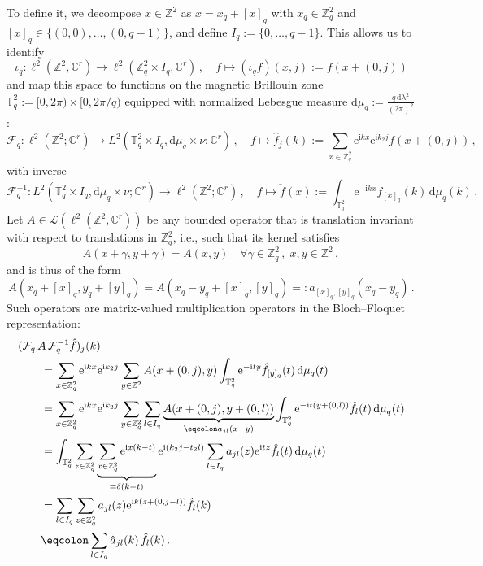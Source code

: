 \documentclass[a4paper]{article}
\newcommand{\T}{\mathbb{T}}
\newcommand{\e}{\mathrm{e}}
\renewcommand{\i}{\mathrm{i}}
\newcommand{\fd}{r}
\newcommand{\Z}{\mathbb{Z}}
\newcommand{\C}{\mathbb{C}}
\newcommand{\mL}{\mathcal{L}}
\theoremstyle{plain}
\theoremstyle{definition}
\theoremstyle{remark}
\renewcommand{\(}{\left(}
\renewcommand{\)}{\right)}
\begin{document}
To define it,  we decompose $x\in\Z^2$ as $x=x_q + [x]_q$ with $x_q\in\Z^2_q$ and $[x]_{q}\in \{(0,0),\ldots,(0,q-1)\}$, and define $I_q:= \{0,\ldots,q-1\}$.
This allows us to  identify 
\[
\iota_q: \ell^2(\Z^2,\C^\fd)\to \ell^2(\Z^2_q \times I_q, \C^{\fd})\,,\quad f\mapsto (\iota_q f)(x,j) := f(x+(0,j))
\]
and map this space to functions on the magnetic Brillouin zone $\T^2_q:= [0,2\pi)\times [0,2\pi/q)$ equipped with normalized Lebesgue measure $\mathrm{d}\mu_q := \frac{q\,\mathrm{d}\lambda^2}{(2\pi)^2}$ :
\[
\mathcal{F}_q: \ell^2(\Z^2;\C^{\fd}) \to L^2(\T^2_q \times I_q,\mathrm{d}\mu_q \times \nu;\C^{\fd})\,,\quad f\mapsto \hat f_j(k) := \sum_{x\in\Z^2_q}\e^{\i k x} \e^{\i k_2 j} f(x+(0,j))\,,
\]
with inverse
\[
\mathcal{F}^{-1}_q:     L^2(\T^2_q \times I_q,\mathrm{d}\mu_q \times \nu;\C^{\fd})\to \ell^2(\Z^2 ;\C^{\fd})\,,\quad f \mapsto \check f(x) := \int_{\T^2_q} \e^{-\i k x} f_{[x]_q}(k)\, \mathrm{d}\mu_q(k)\,.
\]
Let $A\in\mL(\ell^2(\Z^2,\C^\fd))$ be any bounded operator that is translation invariant with respect to translations in $\Z^2_q$, i.e., such that its kernel satisfies 
\[
A(x+\gamma,y+\gamma) = A(x,y) \quad \forall \gamma\in\Z^2_q\,,\;x,y\in \Z^2\,,
\]
and is thus of the form 
\[
A(x_q+[x]_q, y_q+[y]_q) = A(x_q-y_q + [x]_q,[y]_q) =: a_{[x]_q,[y]_q} (x_q-y_q)\,.
\]
Such   operators are matrix-valued multiplication operators in the Bloch--Floquet representation:
\begin{align*}
    \hspace{2em}&\hspace{-2em}
    (\mathcal{F}_q\,A\,\mathcal{F}^{-1}_q \hat f)_j(k)
    \\
    &=
    \sum_{x\in\Z^2_q}\e^{\i k x} \e^{\i k_2 j} \sum_{y\in\Z^2} A(x+(0,j),y) \int_{\T^2_q} \e^{-\i t y} \hat f_{[y]_q}(t) \,\mathrm{d}\mu_q(t)
    \\
    &=
    \sum_{x\in\Z^2_q}\e^{\i k x} \e^{\i k_2 j} \sum_{y\in\Z^2_q} \sum_{l\in I_q} \underbrace{A(x+(0,j),y+(0,l))}_{\eqcolon  a_{jl}(x-y)} \int_{\T^2_q} \e^{-\i t (y+(0,l)) } \hat f_l(t) \,\mathrm{d}\mu_q(t)
    \\
    &=
    \int_{\T^2_q} \sum_{z\in\Z^2_q} 
    \underbrace{\sum_{x\in\Z^2_q}\e^{\i  x(k-t)}}_{=\delta(k-t)} \e^{\i (k_2 j-t_2l)} \sum_{l\in I_q}   a_{jl}(z)\e^{ \i t  z } \hat f_l(t) \,\mathrm{d}\mu_q(t)
    \\
    &=
    \sum_{l\in I_q}  \sum_{z\in\Z^2_q}    a_{jl}(z)\e^{ \i k  (z+(0,j-l)) } \hat f_l(k) \\
    &\eqcolon
    \sum_{l\in I_q}  \hat a_{jl}(k)\,\hat f_l(k)\,.    
\end{align*}
\end{document}

